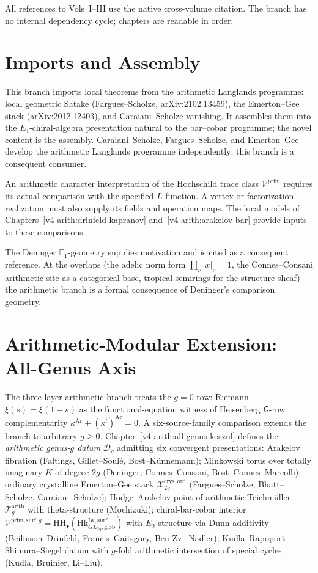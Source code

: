 All references to Vols~I--III use the native cross-volume citation.
The branch has no internal dependency cycle; chapters are readable in
order.

\section{Imports and Assembly}
\label{v4-arith:manifesto:out-of-domain}

This branch imports local theorems from the arithmetic Langlands
programme: local geometric Satake (Fargues--Scholze,
arXiv:2102.13459), the Emerton--Gee stack
(arXiv:2012.12403), and Caraiani--Scholze vanishing.
It assembles them into the \(E_{1}\)-chiral-algebra presentation
natural to the bar--cobar programme; the novel content is the
assembly. Caraiani--Scholze, Fargues--Scholze, and Emerton--Gee
develop the arithmetic Langlands programme independently; this
branch is a consequent consumer.

An arithmetic character interpretation of the Hochschild trace
class \(\mathcal V^{\mathrm{prim}}\) requires its actual
comparison with the specified \(L\)-function.
A vertex or factorization realization must also supply its fields
and operation maps. The local models of
Chapters~\ref{v4-arith:drinfeld-kapranov}
and~\ref{v4-arith:arakelov-bar} provide inputs to these comparisons.

The Deninger \(\mathbb{F}_{1}\)-geometry supplies
motivation and is cited as a consequent reference. At the overlaps
(the adelic norm form \(\prod_{\nu}|x|_{\nu}=1\), the
Connes--Consani arithmetic site as a categorical base, tropical
semirings for the structure sheaf) the arithmetic branch is a formal
consequence of Deninger's comparison geometry.

\section{Arithmetic-Modular Extension: All-Genus Axis}
\label{v4-arith:manifesto:all-genus}

The three-layer arithmetic branch treats the
\(g=0\) row: Riemann \(\xi(s)=\xi(1-s)\) as the functional-equation
witness of Heisenberg \(\mathsf{G}\)-row complementarity
\(\kappa^{\mathrm{Ar}}+(\kappa^{!})^{\mathrm{Ar}}=0\). A six-source-family
comparison extends the branch to arbitrary \(g\geq 0\). Chapter~\ref{v4-arith:all-genus-koszul}
defines the \emph{arithmetic genus-\(g\) datum} \(\mathcal{D}_g\) admitting
six convergent presentations: Arakelov fibration (Faltings, Gillet--Soulé,
Bost--Künnemann); Minkowski torus over totally imaginary \(K\) of
degree \(2g\) (Deninger, Connes--Consani, Bost--Connes--Marcolli); ordinary
crystalline Emerton--Gee stack \(\mathcal{X}_{2g}^{\mathrm{crys,ord}}\)
(Fargues--Scholze, Bhatt--Scholze, Caraiani--Scholze); Hodge--Arakelov
point of arithmetic Teichmüller \(\mathcal{T}_g^{\mathrm{arith}}\) with
theta-structure (Mochizuki); chiral-bar-cobar interior
\(\mathcal{V}^{\mathrm{prim,surf},g}=\mathrm{HH}_\bullet(\mathrm{Hk}^{\mathrm{Iw,surf}}_{GL_{2g},\mathrm{glob}})\)
with \(E_2\)-structure via Dunn additivity (Beilinson--Drinfeld,
Francis--Gaitsgory, Ben-Zvi--Nadler); Kudla--Rapoport Shimura--Siegel
datum with \(g\)-fold arithmetic intersection of special cycles
(Kudla, Bruinier, Li--Liu).

